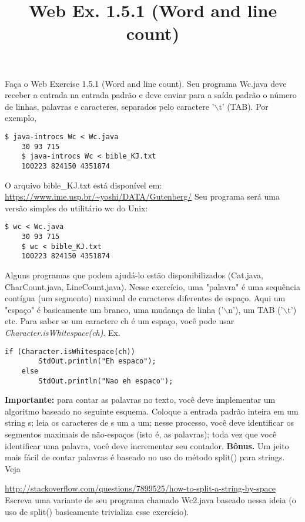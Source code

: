 \documentclass{article}
\title{Web Ex. 1.5.1 (Word and line count)}
\date{}
\author{}
\begin{document}
\maketitle

Fa\c{c}a o Web Exercise 1.5.1 (Word and line count). Seu programa Wc.java deve receber a entrada na entrada padr\~ao e deve enviar para a sa\'ida padr\~ao o n\'umero de linhas, palavras e caracteres, separados pelo caractere '$\backslash$t' (TAB).
\bigbreak
Por exemplo,

\begin{lstlisting}[breaklines, gobble=8]
	$ java-introcs Wc < Wc.java
	30 93 715
	$ java-introcs Wc < bible_KJ.txt 
	100223 824150 4351874
\end{lstlisting}

O arquivo bible\_KJ.txt est\'a dispon\'ivel em: \url{https://www.ime.usp.br/~yoshi/DATA/Gutenberg/}
\bigbreak
Seu programa ser\'a uma vers\~ao simples do utilit\'ario wc do Unix:
\begin{lstlisting}[breaklines, gobble=8]
	$ wc < Wc.java
	30 93 715
	$ wc < bible_KJ.txt 
	100223 824150 4351874
\end{lstlisting}
Alguns programas que podem ajud\'a-lo est\~ao disponibilizados (Cat.java, CharCount.java, LineCount.java).
\bigbreak
Nesse exerc\'icio, uma "palavra" \'e uma sequência cont\'igua (um segmento) maximal de caracteres diferentes de espa\c{c}o. Aqui um "espa\c{c}o" \'e basicamente um branco, uma mudança de linha ('$\backslash$n'), um TAB ('$\backslash$t') etc. Para saber se um caractere ch \'e um espaço, voc\^e pode usar \textit{Character.isWhitespace(ch)}.
\bigbreak
Ex.
\begin{lstlisting}[breaklines, gobble=8]
	if (Character.isWhitespace(ch)) 
	    StdOut.println("Eh espaco");
	else 
	    StdOut.println("Nao eh espaco");
\end{lstlisting}
\bigbreak
\textbf{Importante:} para contar as palavras no texto, voc\^e deve implementar um algoritmo baseado no seguinte esquema. Coloque a entrada padr\~ao inteira em um string s; leia os caracteres de s um a um; nesse processo, voc\^e deve identificar os segmentos maximais de n\~ao-espaços (isto \'e, as palavras); toda vez que voc\^e identificar uma palavra, voc\^e deve incrementar seu contador.
\bigbreak
\textbf{B\^onus.} Um jeito mais f\'acil de contar palavras \'e baseado no uso do m\'etodo split() para strings. Veja

\url{http://stackoverflow.com/questions/7899525/how-to-split-a-string-by-space}
\bigbreak
Escreva uma variante de seu programa chamado Wc2.java baseado nessa ideia (o uso de split() basicamente trivializa esse exerc\'icio).
\end{document}
